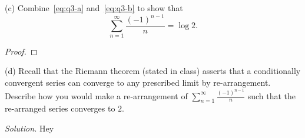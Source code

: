 \documentclass{article}
\begin{document}
(c) Combine~\eqref{eq:q3-a} and~\eqref{eq:q3-b} to show that
%
\begin{equation*}
   \sum_{n = 1}^\infty  \frac{(-1)^{n - 1}}{n} = \log 2.
\end{equation*}

\begin{proof}

\end{proof}

(d) Recall that the Riemann theorem (stated in class) asserts that a
conditionally convergent series can converge to any prescribed limit by
re-arrangement. Describe how you would make a re-arrangement of
$\sum_{n=1}^\infty \frac{(-1)^{n - 1}}{n}$ such that the re-arranged
series converges to $2$.

\textit{Solution.}
Hey
\end{document}
